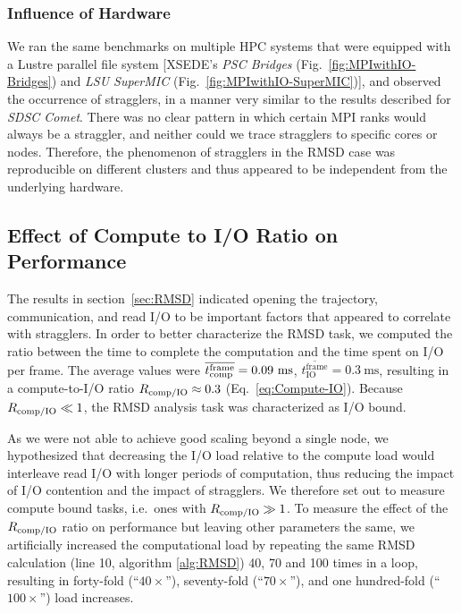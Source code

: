 \subsubsection*{Influence of Hardware}
We ran the same benchmarks on multiple HPC systems that were equipped with a Lustre parallel file system [XSEDE's \emph{PSC Bridges} (Fig.~\ref{fig:MPIwithIO-Bridges}) and \emph{LSU SuperMIC} (Fig.~\ref{fig:MPIwithIO-SuperMIC})], and observed the occurrence of stragglers, in a manner very similar to the results described for \emph{SDSC Comet}.
There was no clear pattern in which certain MPI ranks would always be a straggler, and neither could we trace stragglers to specific cores or nodes.
Therefore, the phenomenon of stragglers in the RMSD case was reproducible on different clusters and thus appeared to be independent from the underlying hardware.

\subsection{Effect of Compute to I/O Ratio on Performance}
\label{sec:bound}

The results in section~\ref{sec:RMSD} indicated opening the trajectory, communication, and read I/O to be important factors that appeared to correlate with stragglers. 
In order to better characterize the RMSD task, we computed the ratio between the time to complete the computation and the time spent on I/O per frame.
The average values were $\overline{\tcomp^{\text{frame}}} = 0.09\ \text{ms}$, $\overline{t_{\text{IO}}^{\text{frame}}} = 0.3\ \text{ms}$, resulting in a compute-to-I/O ratio $R_{\text{comp/IO}} \approx 0.3$ (Eq.~\ref{eq:Compute-IO}).
Because $R_{\text{comp/IO}} \ll 1$, the RMSD analysis task was characterized as I/O bound.

As we were not able to achieve good scaling beyond a single node, we hypothesized that decreasing the I/O load relative to the compute load would interleave read I/O with longer periods of computation, thus reducing the impact of I/O contention and the impact of stragglers.
We therefore set out to measure compute bound tasks, i.e.\ ones with $R_{\text{comp/IO}} \gg 1$.
To measure the effect of the $R_{\text{comp/IO}}$ ratio on performance but leaving other parameters the same, we artificially increased the computational load by repeating the same RMSD calculation (line 10, algorithm \ref{alg:RMSD}) 40, 70 and 100 times in a loop, resulting in forty-fold (``$40\times$''), seventy-fold (``$70\times$''), and one hundred-fold (``$100\times$'') load increases.

